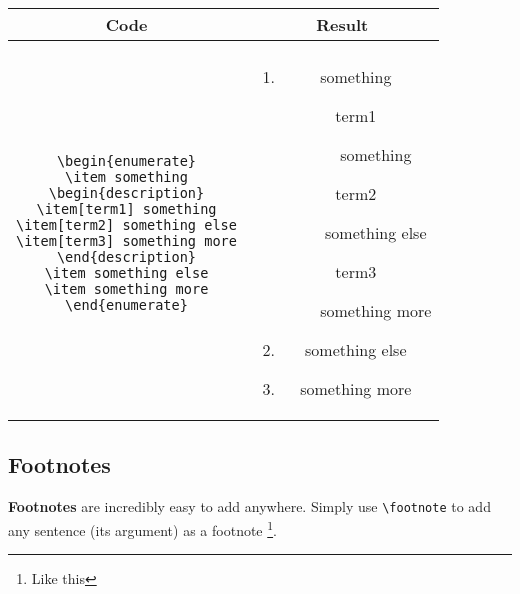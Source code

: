 \begin{center}
\begin{tabular}{cc}

Code & Result\\
\hline\\

\parbox{6cm}{
	\texttt{\textbackslash begin\{enumerate\}\\
	\textbackslash item something\\
	\textbackslash begin\{description\}\\
	\textbackslash item[term1]  something\\
	\textbackslash item[term2]  something else\\
	\textbackslash item[term3]  something more\\
	\textbackslash end\{description\}\\
	\textbackslash item something else\\
	\textbackslash item something more\\
	\textbackslash end\{enumerate\}\\
	}
} 

&

\parbox{6cm}{
	\begin{enumerate}
	\item something
		\begin{description}
		\item[term1] something
		\item[term2] something else
		\item[term3] something more
		\end{description}

	\item something else
	\item something more
	\end{enumerate}
}
\end{tabular}
\end{center}






\subsection{Footnotes}
\textbf{Footnotes} are incredibly easy to add anywhere. Simply use \texttt{\textbackslash footnote} to add any sentence (its argument) as a footnote \footnote{Like this}.


